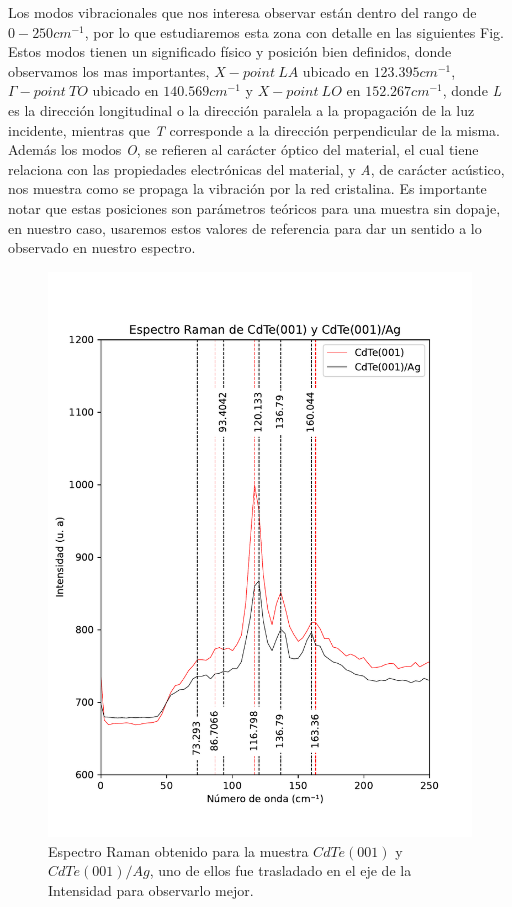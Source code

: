 Los modos vibracionales que nos interesa observar están dentro del rango de $ 0-250 cm^{-1}$, por lo que estudiaremos esta zona con detalle en las siguientes Fig. Estos modos tienen un significado físico y posición bien definidos, donde observamos los mas importantes, $X-point\ LA$ ubicado en $123.395cm^{-1}$, $\Gamma-point\ TO$ ubicado en $140.569cm^{-1}$ y $X-point\ LO$ en $152.267cm^{-1}$, donde \textit{L} es la dirección longitudinal o la dirección paralela a la propagación de la luz incidente, mientras que \textit{T} corresponde a la dirección perpendicular de la misma. Además los modos \textit{O}, se refieren al carácter óptico del material, el cual tiene relaciona con las propiedades electrónicas del material, y \textit{A}, de carácter acústico, nos muestra como se propaga la vibración por la red cristalina.\cite{Nassar2016} Es importante notar que estas posiciones son parámetros teóricos para una muestra sin dopaje, en nuestro caso, usaremos estos valores de referencia para dar un sentido a lo observado en nuestro espectro.

\begin{figure}[H]
    \centering
    \includegraphics[width=1\textwidth]{figures/chap4/cdte-ag/raman-results/raman-CdTeAg-250.pdf}
        \caption{Espectro Raman obtenido para la muestra $CdTe(001)$ y $CdTe(001)/Ag$, uno de ellos 
        fue trasladado en el eje de la Intensidad para observarlo mejor.}
    \label{fig:raman-cdte-250}
\end{figure}

